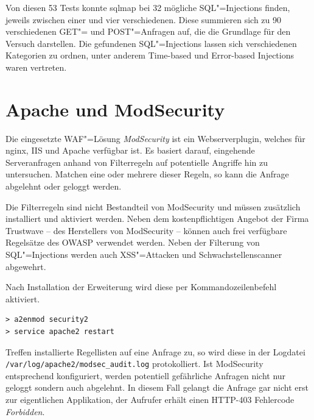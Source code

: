 Von diesen 53 Tests konnte sqlmap bei 32 mögliche SQL"=Injections finden, jeweils zwischen einer und vier verschiedenen. Diese summieren sich zu 90 verschiedenen GET"= und POST"=Anfragen auf, die die Grundlage für den Versuch darstellen. Die gefundenen SQL"=Injections lassen sich verschiedenen Kategorien zu ordnen, unter anderem Time-based und Error-based Injections waren vertreten.

\section{Apache und ModSecurity}
\label{sec:modsecurity}

Die eingesetzte WAF"=Lösung \emph{ModSecurity} ist ein Webserverplugin, welches für nginx, IIS und Apache verfügbar ist. Es basiert darauf, eingehende Serveranfragen anhand von Filterregeln auf potentielle Angriffe hin zu untersuchen. Matchen eine oder mehrere dieser Regeln, so kann die Anfrage abgelehnt oder geloggt werden.

Die Filterregeln sind nicht Bestandteil von ModSecurity und müssen zusätzlich installiert und aktiviert werden. Neben dem kostenpflichtigen Angebot der Firma Trustwave -- des Herstellers von ModSecurity -- können auch frei verfügbare Regelsätze des OWASP verwendet werden. Neben der Filterung von SQL"=Injections werden auch XSS"=Attacken und Schwachstellenscanner abgewehrt.

Nach Installation der Erweiterung wird diese per Kommandozeilenbefehl aktiviert.

\begin{listing}[ht!]
\begin{verbatim}
> a2enmod security2
> service apache2 restart
\end{verbatim}
\end{listing}


Treffen installierte Regellisten auf eine Anfrage zu, so wird diese in der Logdatei \texttt{/var/log/apache2/modsec\_audit.log} protokolliert. Ist ModSecurity entsprechend konfiguriert, werden potentiell gefährliche Anfragen nicht nur geloggt sondern auch abgelehnt. In diesem Fall gelangt die Anfrage gar nicht erst zur eigentlichen Applikation, der Aufrufer erhält einen HTTP-403 Fehlercode \emph{Forbidden}.

